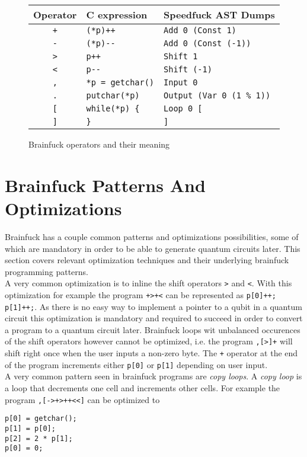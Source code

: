 \documentclass[11pt, a4paper]{article}
\begin{document}
\begin{figure}[H]
	\centering
	\begin{tabular}{| c | l | l |}
	\hline
	Operator & C expression & Speedfuck AST Dumps \\
	\hline
	\verb'+' & \verb'(*p)++' & \verb'Add 0 (Const 1)' \\
	\verb'-' & \verb'(*p)--' & \verb'Add 0 (Const (-1))' \\
	\verb'>' & \verb'p++' & \verb'Shift 1' \\
	\verb'<' & \verb'p--' & \verb'Shift (-1)' \\
	\verb',' & \verb'*p = getchar()' & \verb'Input 0' \\
	\verb'.' & \verb'putchar(*p)' & \verb'Output (Var 0 (1 % 1))' \\
	\verb'[' & \verb'while(*p) {' & \verb'Loop 0 [' \\
	\verb']' & \verb'}' & \verb']' \\
	\hline
	\end{tabular}
	\caption{Brainfuck operators and their meaning}
	\label{fig:bfbasics}
\end{figure}

\section{Brainfuck Patterns And Optimizations} \label{sec:bfpatterns}
Brainfuck has a couple common patterns and optimizations possibilities, some of which are mandatory in order to be able to generate quantum circuits later. This section covers relevant optimization techniques and their underlying brainfuck programming patterns. \\
A very common optimization is to inline the shift operators \verb'>' and \verb'<'. With this optimization for example the program \verb'+>+<' can be represented as \verb'p[0]++; p[1]++;'. As there is no easy way to implement a pointer to a qubit in a quantum circuit this optimization is mandatory and required to succeed in order to convert a program to a quantum circuit later. Brainfuck loops wit unbalanced occurences of the shift operators however cannot be optimized, i.e. the program \verb',[>]+' will shift right once when the user inputs a non-zero byte. The \verb'+' operator at the end of the program increments either \verb'p[0]' or \verb'p[1]' depending on user input. \\
A very common pattern seen in brainfuck programs are \textit{copy loops}. A \textit{copy loop} is a loop that decrements one cell and increments other cells. For example the program \verb',[->+>++<<]' can be optimized to
\begin{verbatim}
p[0] = getchar();
p[1] = p[0];
p[2] = 2 * p[1];
p[0] = 0;
\end{verbatim}
\end{document}
